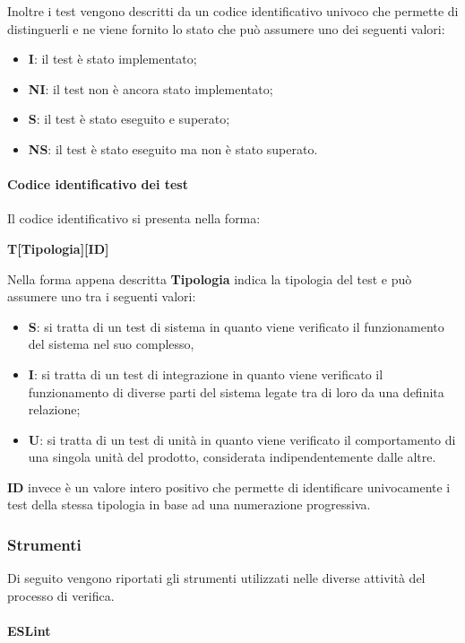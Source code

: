 Inoltre i test vengono descritti da un codice identificativo univoco che permette di distinguerli e ne viene fornito lo stato che può 
assumere uno dei seguenti valori:
\begin{itemize}
    \item \textbf{I}: il test è stato implementato;
    \item \textbf{NI}: il test non è ancora stato implementato;
    \item \textbf{S}: il test è stato eseguito e superato;
    \item \textbf{NS}: il test è stato eseguito ma non è stato superato.
\end{itemize}

\paragraph{Codice identificativo dei test}
Il codice identificativo si presenta nella forma:
\begin{center}
    \textbf{T[Tipologia][ID]}
\end{center}
Nella forma appena descritta \textbf{Tipologia} indica la tipologia del test e può assumere uno tra i seguenti valori:
\begin{itemize}
	\item \textbf{S}: si tratta di un test di sistema in quanto viene verificato il funzionamento del sistema nel suo complesso, 
	\item \textbf{I}: si tratta di un test di integrazione in quanto viene verificato il funzionamento di diverse parti del sistema legate 
		tra di loro da una definita relazione;
	\item \textbf{U}: si tratta di un test di unità in quanto viene verificato il comportamento di una singola unità del prodotto, 
		considerata indipendentemente dalle altre.
\end{itemize}

\textbf{ID} invece è un valore intero positivo che permette di identificare univocamente i test della stessa tipologia in base ad una 
numerazione progressiva.

\subsubsection{Strumenti}
\label{ssub:verifica:strumenti}

Di seguito vengono riportati gli strumenti utilizzati nelle diverse attività del processo di verifica.

\paragraph{ESLint}
\label{par:verifica:ESLint}

